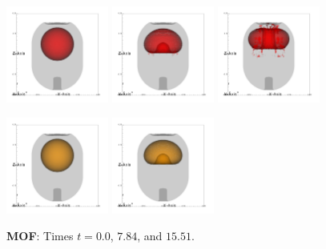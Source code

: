 \documentclass[preprint,12pt]{Definitions/elsarticle}
\begin{document}
\begin{figure}[H]
	\centering
	\begin{minipage}[b]{1\linewidth}
		\centering
		\includegraphics[width=0.3\textwidth]{jet2_mof1.png} 
		\includegraphics[width=0.3\textwidth]{jet2_mof2.png} 
		\includegraphics[width=0.3\textwidth]{jet2_mof3.png} 
		\vspace{-1em}
		\caption*{\textbf{MOF}: Times $t=0.0$, $7.84$, and $15.51$.}
		\label{3DWEJ5p25mof}
	\end{minipage}
	\begin{minipage}[b]{1\linewidth}
		\centering
		\includegraphics[width=0.3\textwidth]{jet2_cmof1.png} 
		\includegraphics[width=0.3\textwidth]{jet2_cmof2.png} 

\end{minipage}
\end{figure}
\end{document}
